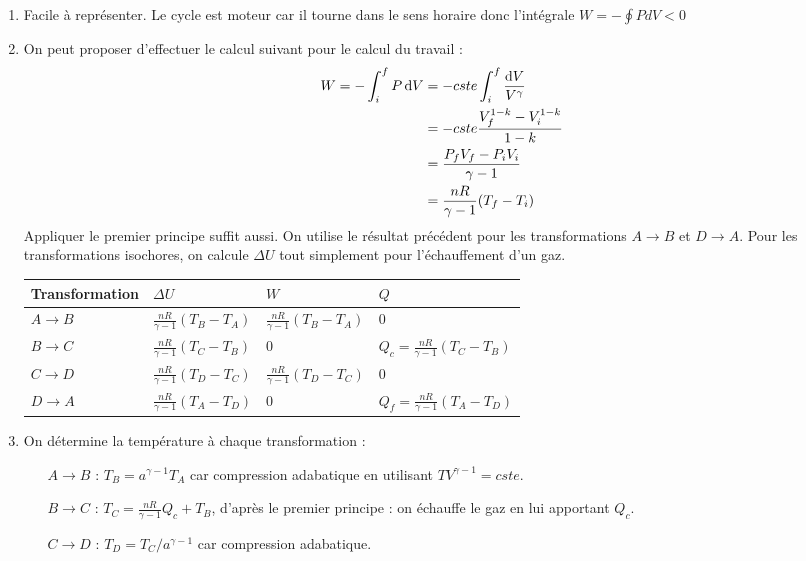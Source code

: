 \begin{correction}

\begin{enumerate}

	\item Facile à représenter. Le cycle est moteur car il tourne dans le sens horaire donc l'intégrale $W=-\oint PdV<0$

	\item On peut proposer d'effectuer le calcul suivant pour le calcul du travail :
	\begin{align*}
	W = -\int_i^f P\mathop{}\!\mathrm{d} V &= -cste\int_i^f \frac{\mathop{}\!\mathrm{d} V}{V^{\gamma}}\\
	&=-cste\frac{V_f^{1-k}-V_i^{1-k}}{1-k}\\
	&=\frac{P_fV_f-P_iV_i}{\gamma-1}\\
	&= \frac{nR}{\gamma-1}(T_f-T_i)
\end{align*}
Appliquer le premier principe suffit aussi. On utilise le résultat précédent pour les transformations $A\rightarrow B$ et $D\rightarrow A$. Pour les transformations isochores, on calcule $\Delta U$ tout simplement pour l'échauffement d'un gaz.

\begin{center}
\begin{tabular}{|p{}|p{3cm}|p{3cm}|p{3cm}|}
\hline
Transformation & $\Delta U$ & $W$ & $Q$ \\
\hline
$A\rightarrow B$ & $\frac{nR}{\gamma-1}(T_B-T_A)$  & $\frac{nR}{\gamma-1}(T_B-T_A)$  & 0  \\
\hline
$B\rightarrow C$ & $\frac{nR}{\gamma-1}(T_C-T_B)$ & 0 & $Q_c=\frac{nR}{\gamma-1}(T_C-T_B)$  \\
\hline
$C\rightarrow D$ & $\frac{nR}{\gamma-1}(T_D-T_C)$  & $\frac{nR}{\gamma-1}(T_D-T_C)$ & 0 \\
\hline
$D\rightarrow A$ & $\frac{nR}{\gamma-1}(T_A-T_D)$ & 0 & $Q_f=\frac{nR}{\gamma-1}(T_A-T_D)$ \\
\hline
\end{tabular}
\end{center}

\item On détermine la température à chaque transformation :
\begin{itemize}
	\item[$A\rightarrow B$ :] $T_B=a^{\gamma-1}T_A$ car compression adabatique en utilisant $TV^{\gamma-1}=cste$.
	\item[$B\rightarrow C$ :] $T_C=\frac{nR}{\gamma-1}Q_c + T_B$, d'après le premier principe : on échauffe le gaz en lui apportant $Q_c$.
	\item[$C\rightarrow D$ :] $T_D=T_C/a^{\gamma-1}$ car compression adabatique.
\end{itemize}



\end{enumerate}
\end{correction}
